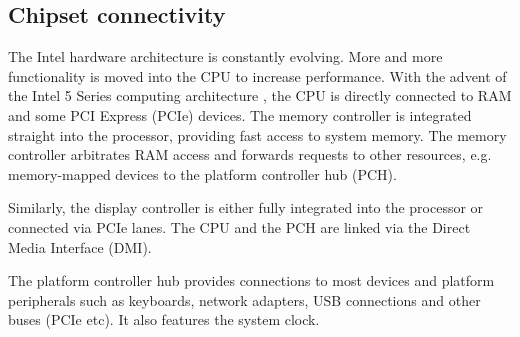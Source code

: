 \subsection{Chipset connectivity}
The Intel hardware architecture is constantly evolving. More and more
functionality is moved into the CPU to increase performance. With the advent of
the Intel 5 Series computing architecture \cite{wiki:intel:5:series}, the
CPU is directly connected to RAM and some PCI Express
(PCIe) devices. The memory controller is integrated straight into
the processor, providing fast access to system memory.  The memory controller
arbitrates RAM access and forwards requests to other resources, e.g.
memory-mapped devices to the platform controller hub (PCH).

Similarly, the display controller is either fully integrated into the processor
or connected via PCIe lanes. The CPU and the PCH are linked via the Direct
Media Interface (DMI).

The platform controller hub provides connections to most devices and
platform peripherals such as keyboards, network adapters, USB connections and
other buses (PCIe etc). It also features the system clock.
